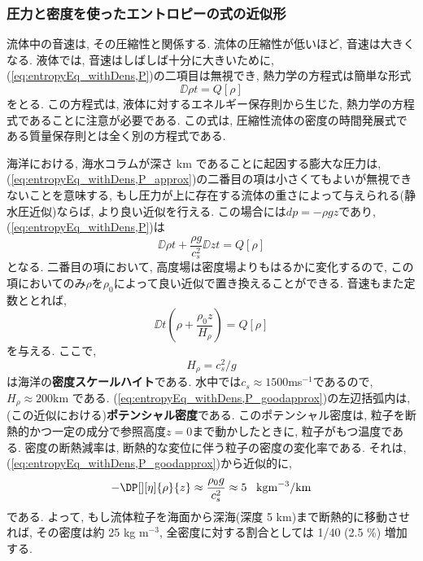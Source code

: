 \subsubsection*{圧力と密度を使ったエントロピーの式の近似形}
流体中の音速は, その圧縮性と関係する. 
流体の圧縮性が低いほど, 音速は大きくなる. 
液体では, 音速はしばしば十分に大きいために, 
(\ref{eq:entropyEq_withDens,P})の二項目は無視でき, 
熱力学の方程式は簡単な形式
\begin{equation}
 \DD{\rho}{t} = Q[\rho]
\label{eq:entropyEq_withDens,P_approx}
\end{equation}
をとる. 
この方程式は, 液体に対するエネルギー保存則から生じた, 熱力学の方程式であることに注意が必要である. 
この式は, 圧縮性流体の密度の時間発展式である質量保存則とは全く別の方程式である. 

海洋における, 海水コラムが深さ km であることに起因する膨大な圧力は, 
(\ref{eq:entropyEq_withDens,P_approx})の二番目の項は小さくてもよいが無視できないことを意味する, 
もし圧力が上に存在する流体の重さによって与えられる(静水圧近似)ならば, より良い近似を行える. 
この場合には$dp = -\rho gz$であり, (\ref{eq:entropyEq_withDens,P})は
\begin{equation}
 \DD{\rho}{t} + \dfrac{\rho g}{c_s^2}\DD{z}{t} = Q[\rho]
\end{equation}
となる. 
二番目の項において, 高度場は密度場よりもはるかに変化するので, 
この項においてのみ$\rho$を$\rho_0$によって良い近似で置き換えることができる. 
音速もまた定数ととれば, 
\begin{equation}
 \DD{}{t} \left(\rho + \dfrac{\rho_0 z}{H_\rho} \right)
 = Q[\rho]
 \label{eq:entropyEq_withDens,P_goodapprox}
\end{equation}
を与える. 
ここで, 
\begin{equation}
 H_\rho = c_s^2/g
  \label{eq:dens_scale_height}
\end{equation}
は海洋の\textbf{密度スケールハイト}である. 
水中では$c_s \approx 1500$ms$^{-1}$であるので, $H_\rho \approx 200$km である. 
(\ref{eq:entropyEq_withDens,P_goodapprox})の左辺括弧内は, (この近似における)\textbf{ポテンシャル密度}である. 
このポテンシャル密度は, 粒子を断熱的かつ一定の成分で参照高度$z=0 $まで動かしたときに, 
粒子がもつ温度である. 
密度の断熱減率は, 断熱的な変位に伴う粒子の密度の変化率である. 
それは, (\ref{eq:entropyEq_withDens,P_goodapprox})から近似的に, 
\begin{equation}
 -\DP[][\eta]{\rho}{z} \approx \dfrac{\rho_0 g}{c_s^2}
  \approx 5 \;\;\; \text{kgm$^{-3}$/km}
\end{equation}
である. 
よって, もし流体粒子を海面から深海(深度 5 km)まで断熱的に移動させれば, 
その密度は約 25 kg m$^{-3}$,  
全密度に対する割合としては 1/40 (2.5 \%) 増加する. 
 
